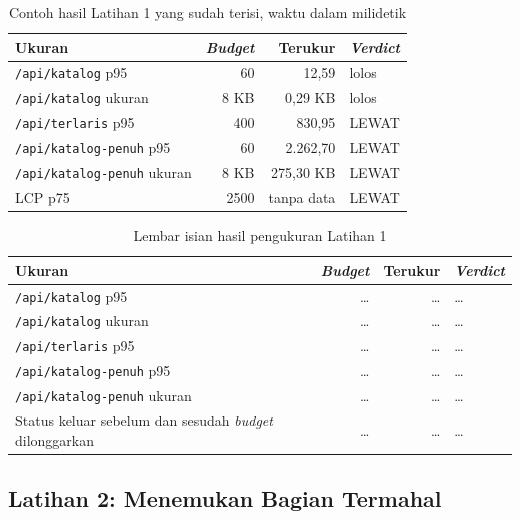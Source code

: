 \begin{table}[!htb]
  \centering
  \caption{Contoh hasil Latihan 1 yang sudah terisi, waktu dalam milidetik}
  \label{tab:c5-lat1-contoh}
  \begin{tabularx}{\textwidth}{Xrrl}
    \hline
    \textbf{Ukuran} & \textbf{\textit{Budget}} & \textbf{Terukur} & \textbf{\textit{Verdict}} \\
    \hline
    \texttt{/api/katalog} p95 & 60 & 12,59 & lolos \\
    \hline
    \texttt{/api/katalog} ukuran & 8 KB & 0,29 KB & lolos \\
    \hline
    \texttt{/api/terlaris} p95 & 400 & 830,95 & LEWAT \\
    \hline
    \texttt{/api/katalog-penuh} p95 & 60 & 2.262,70 & LEWAT \\
    \hline
    \texttt{/api/katalog-penuh} ukuran & 8 KB & 275,30 KB & LEWAT \\
    \hline
    LCP p75 & 2500 & tanpa data & LEWAT \\
    \hline
  \end{tabularx}
\end{table}

\begin{table}[!htb]
  \centering
  \caption{Lembar isian hasil pengukuran Latihan 1}
  \label{tab:c5-lat1-hasil}
  \begin{tabularx}{\textwidth}{Xrrl}
    \hline
    \textbf{Ukuran} & \textbf{\textit{Budget}} & \textbf{Terukur} & \textbf{\textit{Verdict}} \\
    \hline
    \texttt{/api/katalog} p95 & \dots & \dots & \dots \\
    \hline
    \texttt{/api/katalog} ukuran & \dots & \dots & \dots \\
    \hline
    \texttt{/api/terlaris} p95 & \dots & \dots & \dots \\
    \hline
    \texttt{/api/katalog-penuh} p95 & \dots & \dots & \dots \\
    \hline
    \texttt{/api/katalog-penuh} ukuran & \dots & \dots & \dots \\
    \hline
    Status keluar sebelum dan sesudah \textit{budget} dilonggarkan & \dots & \dots & \dots \\
    \hline
  \end{tabularx}
\end{table}

\subsection*{Latihan 2: Menemukan Bagian Termahal}

